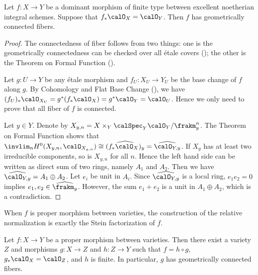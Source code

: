 \begin{proposition}\label{lem:connected_fiber_by_pushforward_of_structure_sheaves}
	Let $f: X \to Y$ be a dominant morphism of finite type between excellent noetherian integral schemes.
	Suppose that $f_*\calO_X = \calO_Y$.
	Then $f$ has geometrically connected fibers.
\end{proposition}
\begin{proof}
	The connectedness of fiber follows from two things: one is the geometrically connectedness can be checked over all \'{e}tale covers (\cite[\href{https://stacks.math.columbia.edu/tag/03GZ}{Tag 03GZ}]{Stacks}); the other is the Theorem on Formal Function (\cite[\href{https://stacks.math.columbia.edu/tag/02OD}{Tag 02OD}]{Stacks}).

	Let $g:U \to Y$ be any \'etale morphism and $f_U:X_U \to Y_U$ be the base change of $f$ along $g$.
	By Cohomology and Flat Base Change (\cite[\href{https://stacks.math.columbia.edu/tag/02KH}{Tag 02KH}]{Stacks}), we have $(f_U)_*\calO_{X_U} = g^*(f_*\calO_X) = g^*\calO_Y=\calO_{U}$.
	Hence we only need to prove that all fiber of $f$ is connected.

	Let $y \in Y$.
	Denote by $X_{y,n} = X \times_Y \calSpec_Y \calO_Y/\frakm_y^n$.
	The Theorem on Formal Function shows that $\invlim_{n} H^0(X_{y,n},\calO_{X_{y,n}}) \cong \widehat{(f_*\calO_X)_y} = \widehat{\calO_{Y,y}}$.
	If $X_y$ has at least two irreducible components, so is $X_{y,n}$ for all $n$.
	Hence the left hand side can be written as direct sum of two rings, namely $A_1$ and $A_2$.
	Then we have $\widehat{\calO_{Y,y}} = A_1 \oplus A_2$.
	Let $e_i$ be unit in $A_i$.
	Since $\widehat{\calO_{Y,y}}$ is a local ring, $e_1e_2 = 0$ implies $e_1,e_2 \in \widehat{\frakm_{y}}$.
	However, the sum $e_1+e_2$ is a unit in $A_1 \oplus A_2$, which is a contradiction.
\end{proof}

When $f$ is proper morphism between varieties, the construction of the relative normalization is exactly the Stein factorization of $f$.

\begin{corollary}
	Let $f: X \to Y$ be a proper morphism between varieties.
	Then there exist a variety $Z$ and morphisms $g: X \to Z$ and $h: Z \to Y$ such that $f = h \circ g$, $g_* \calO_X = \calO_Z$, and $h$ is finite.
	In particular, $g$ has geometrically connected fibers.
\end{corollary}

